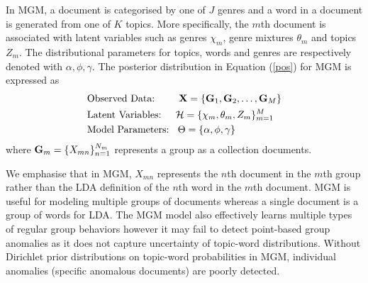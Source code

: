 In MGM, a document is  categorised by one of $J$ genres and a word in a document is generated from one of $K$ topics.   More specifically, the $m$th document is associated with latent variables such as genres $\chi_{m}$, genre mixtures $\theta_{m}$ and topics $Z_m$. 
The distributional parameters for topics, words and genres are respectively denoted with $\alpha,\phi,\gamma$. 
 The  posterior distribution in Equation  (\ref{pos})   for MGM is expressed as %
 \begin{align*}
& \mbox{Observed Data:  \;\; \quad}  {\bf X}= \{{\bf G}_{1},{\bf G}_{2},\dots,{\bf G}_{M} \}\\
 & \mbox{Latent Variables: \quad}    \mathcal{H}=\{\chi_{m},\theta_m, Z_{m} \}_{m=1}^M  \\
 & \mbox{Model Parameters: \;\,}  \Theta=\{\alpha,\phi,\gamma\}
 \end{align*} 
  where ${\bf G}_{m} = \{ X_{mn} \}_{n=1}^{N_{m}}$ represents a group as a collection documents.  
  

We emphasise that in MGM, $  X_{mn} $ represents the $n$th document in the $m$th group rather than the LDA definition of the $n$th word in the $m$th document.   MGM is useful for modeling multiple groups of documents whereas a single document is a group of words for LDA.  
The MGM model also effectively learns multiple types of regular group behaviors however it may  fail to detect   point-based group anomalies  as it does not capture uncertainty of topic-word distributions. Without   Dirichlet prior distributions on topic-word probabilities in MGM, individual anomalies (specific anomalous documents) are poorly detected. 
 
 
 






